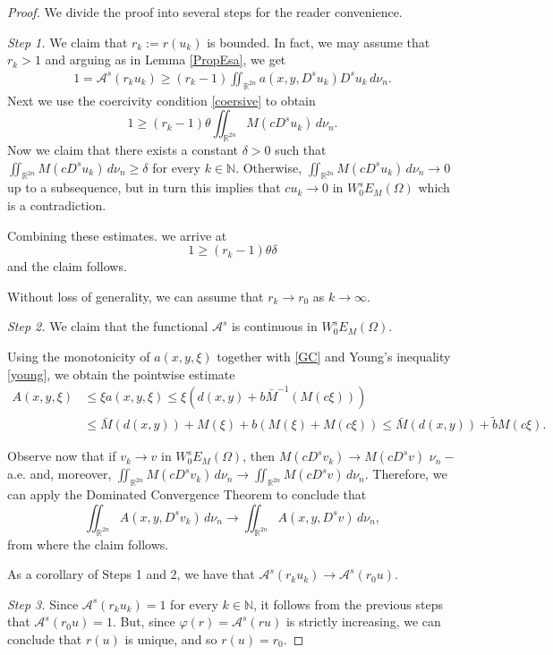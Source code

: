 \documentclass{amsart}
\newcommand{\R}{{\mathbb R}}
\newcommand{\N}{{\mathbb N}}
\newcommand{\EE}{{\mathcal A}^s}
\theoremstyle{remark}
\theoremstyle{definition}
\numberwithin{equation}{section}
\begin{document}
\begin{proof}
We divide the proof into several steps for the reader convenience.

{\em Step 1.} We claim that $r_k:=r(u_k)$ is bounded. In fact, we may assume that $r_k>1$ and arguing as in Lemma \ref{PropEsa}, we get
\begin{align*}
1 = \EE(r_k u_k) \ge (r_k-1)\iint_{\R^{2n}} a(x, y, D^s u_k) D^s u_k\, d\nu_n.
\end{align*}
Next we use the coercivity condition \ref{coersive} to obtain
$$
1\ge (r_k-1) \theta \iint_{\R^{2n}} M(cD^s u_k)\, d\nu_n.
$$
Now we claim that there exists a constant $\delta>0$ such that $\iint_{\R^{2n}} M(cD^s u_k)\, d\nu_n\ge \delta$ for every $k\in\N$. Otherwise, $\iint_{\R^{2n}} M(cD^s u_k)\, d\nu_n\to 0$ up to a subsequence, but in turn this implies that $cu_k\to 0$ in $W^s_0E_M(\Omega)$ which is a contradiction.

Combining these estimates. we arrive at
$$
1\ge (r_k-1)\theta\delta
$$
and the claim follows.

Without loss of generality, we can assume that $r_k\to r_0$ as $k\to\infty$.

\medskip

{\em Step 2.} We claim that the functional $\EE$ is continuous in $W^s_0E_M(\Omega)$.

Using the monotonicity of $a(x, y, \xi)$ together with \eqref{GC} and Young's inequality \eqref{young}, we obtain the pointwise estimate
\begin{align*}
A(x, y, \xi) &\le \xi a(x, y, \xi) \le \xi (d(x, y) + b \bar M^{-1}(M(c\xi)))\\
&\le \bar M(d(x, y)) + M(\xi) + b(M(\xi) + M(c\xi)) \le \bar M(d(x, y)) + \tilde b M(c\xi).
\end{align*}

Observe now that if $v_k\to v$ in $W^s_0E_M(\Omega)$, then $M(cD^s v_k)\to M(c D^s v)$ $\nu_n-$a.e. and, moreover, $\iint_{\R^{2n}}M(cD^s v_k)\, d\nu_n\to  \iint_{\R^{2n}}M(cD^s v)\, d\nu_n$. Therefore, we can apply the Dominated Convergence Theorem to conclude that
$$
\iint_{\R^{2n}} A(x, y, D^s v_k)\, d\nu_n\to \iint_{\R^{2n}} A(x, y, D^s v)\, d\nu_n,
$$
from where the claim follows.

As a corollary of Steps 1 and 2, we have that $\EE(r_k u_k)\to \EE(r_0 u)$.

\medskip

{\em Step 3.} Since $\EE(r_k u_k)=1$ for every $k\in\N$, it follows from the previous steps that $\EE(r_0 u)= 1$. But, since $\varphi(r) = \EE(ru)$ is strictly increasing, we can conclude that $r(u)$ is unique, and so $r(u)=r_0$.
\end{proof}
\end{document}
